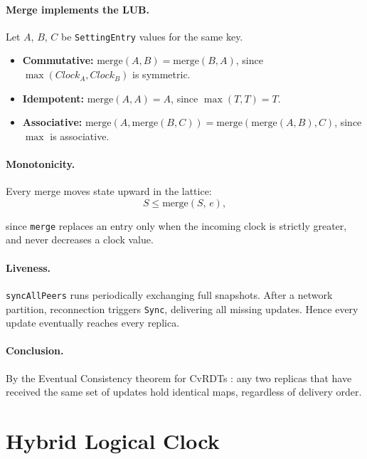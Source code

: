 \documentclass[conference]{IEEEtran}
\begin{document}
\paragraph{Merge implements the LUB.}
Let $A$, $B$, $C$ be \texttt{SettingEntry} values for the same key.

\begin{itemize}
  \item \textbf{Commutative:} $\mathrm{merge}(A,B) = \mathrm{merge}(B,A)$, since
    $\max(\mathit{Clock}_A, \mathit{Clock}_B)$ is symmetric.
  \item \textbf{Idempotent:} $\mathrm{merge}(A,A) = A$, since
    $\max(T,T) = T$.
  \item \textbf{Associative:} $\mathrm{merge}(A,\mathrm{merge}(B,C)) = \mathrm{merge}(\mathrm{merge}(A,B),C)$, since $\max$ is associative.
\end{itemize}

\paragraph{Monotonicity.}
Every merge moves state upward in the lattice:
\begin{equation}
  S \leq \mathrm{merge}(S,\, e),
\end{equation}

since \texttt{merge} replaces an entry only when the incoming clock is strictly
greater, and never decreases a clock value.

\paragraph{Liveness.}
\texttt{syncAllPeers} runs periodically exchanging full snapshots. After a
network partition, reconnection triggers \texttt{Sync}, delivering all missing updates.
Hence every update eventually reaches every replica.

\paragraph{Conclusion.}
By the Eventual Consistency theorem for CvRDTs \cite{shapiro2011}: any
two replicas that have received the same set of updates hold identical maps,
regardless of delivery order.

\section{Hybrid Logical Clock}
\label{sec:hlc}
\end{document}

